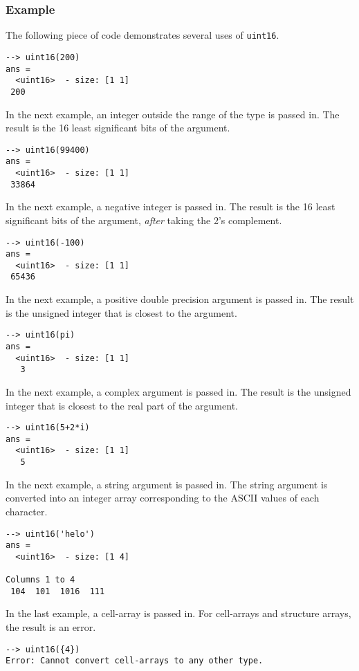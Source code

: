 \subsubsection{Example}
The following piece of code demonstrates several uses of \verb|uint16|.
\begin{verbatim}
--> uint16(200)
ans =
  <uint16>  - size: [1 1]
 200
\end{verbatim}
In the next example, an integer outside the range  of the type is passed in.  The result is the 16 least significant bits of the argument.
\begin{verbatim}
--> uint16(99400)
ans =
  <uint16>  - size: [1 1]
 33864
\end{verbatim}
In the next example, a negative integer is passed in.  The result is the 16 least significant bits of the argument, \emph{after} taking the 2's complement.
\begin{verbatim}
--> uint16(-100)
ans =
  <uint16>  - size: [1 1]
 65436
\end{verbatim}
In the next example, a positive double precision argument is passed in.  The result is the unsigned integer that is closest to the argument.
\begin{verbatim}
--> uint16(pi)
ans =
  <uint16>  - size: [1 1]
   3
\end{verbatim}
In the next example, a complex argument is passed in.  The result is the unsigned integer that is closest to the real part of the argument.
\begin{verbatim}
--> uint16(5+2*i)
ans =
  <uint16>  - size: [1 1]
   5
\end{verbatim}
In the next example, a string argument is passed in.  The string argument is converted into an integer array corresponding to the ASCII values of each character.
\begin{verbatim}
--> uint16('helo')
ans =
  <uint16>  - size: [1 4]
  
Columns 1 to 4
 104  101  1016  111
\end{verbatim}
In the last example, a cell-array is passed in.  For cell-arrays and structure arrays, the result is an error.
\begin{verbatim}
--> uint16({4})
Error: Cannot convert cell-arrays to any other type.
\end{verbatim}
